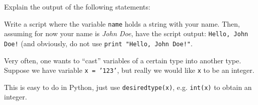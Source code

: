 \begin{questions}

    Explain the output of the following statements:

    Write a script where the variable \texttt{name} holds a string with your name.
    Then, assuming for now your name is \emph{John Doe}, have the script output:
    \texttt{Hello, John Doe!} (and obviously, do not use
    \texttt{print "Hello, John Doe!"}.


    Very often, one wants to ``cast'' variables of a certain type into another type.
    Suppose we have variable \texttt{x = '123'}, but really we would like \texttt{x} to be
    an integer.

    This is easy to do in Python, just use \texttt{desiredtype(x)}, e.g. \texttt{int(x)}
    to obtain an integer.


\end{questions}
